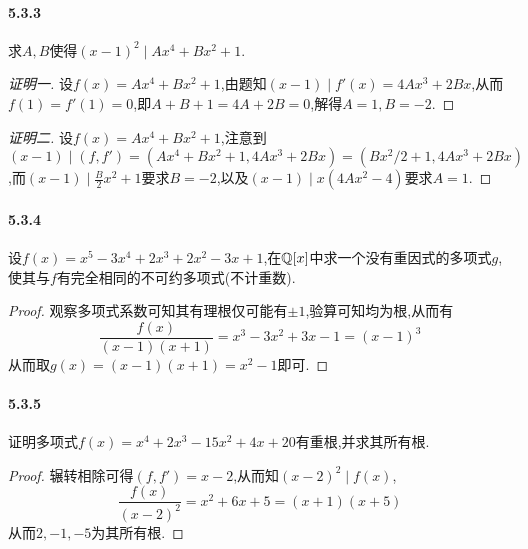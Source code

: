 \documentclass[11pt]{article}
\begin{document}
\paragraph{5.3.3}求$A,B$使得$(x-1)^2\mid Ax^4+Bx^2+1$.
\begin{proof}[证明一]
    设$f(x)=Ax^4+Bx^2+1$,由题知$(x-1)\mid f'(x)=4Ax^3+2Bx$,从而$f(1)=f'(1)=0$,即$A+B+1=4A+2B=0$,解得$A=1, B=-2$.
\end{proof}
\begin{proof}[证明二]
    设$f(x)=Ax^4+Bx^2+1$,注意到$(x-1)\mid (f,f')=(Ax^4+Bx^2+1,4Ax^3+2Bx)=(Bx^2/2+1,4Ax^3+2Bx)$,而$(x-1)\mid \frac{B}{2}x^2+1$要求$B=-2$,以及$(x-1)\mid x(4Ax^2-4)$要求$A=1$.
\end{proof}
\paragraph{5.3.4}设$f(x)=x^5-3x^4+2x^3+2x^2-3x+1$,在$\mathbb{Q}[x]$中求一个没有重因式的多项式$g$,使其与$f$有完全相同的不可约多项式(不计重数).
\begin{proof}
    观察多项式系数可知其有理根仅可能有$\pm 1$,验算可知均为根,从而有
    $$\frac{f(x)}{(x-1)(x+1)}=x^3-3 x^2+3 x-1=(x-1)^3$$
    从而取$g(x)=(x-1)(x+1)=x^2-1$即可.
\end{proof}
\paragraph{5.3.5}证明多项式$f(x)=x^4+2x^3-15x^2+4x+20$有重根,并求其所有根.
\begin{proof}
    辗转相除可得$(f,f')=x-2$,从而知$(x-2)^2\mid f(x)$,
    $$\frac{f(x)}{(x-2)^2}=x^2+6 x+5=(x+1)(x+5)$$
    从而$2,-1,-5$为其所有根.
\end{proof}
\end{document}
